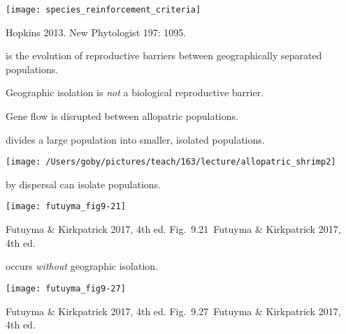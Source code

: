 \documentclass[t]{beamer}
\newcommand{\futuyma}[1]{%
	\ifthenelse{\isempty{#1}}%
	{Futuyma \& Kirkpatrick 2017, 4th ed.}%
	{Fig.~#1~Futuyma \& Kirkpatrick 2017, 4th ed.}%
}
\newcommand{\backskip}{\vspace{-0.5\baselineskip}}
\begin{document}
\begin{frame}
\centering

\texttt{[image: species\_reinforcement\_criteria]}

\tinyfill Hopkins 2013. New Phytologist 197: 1095.

\end{frame}


\begin{frame}{ is the evolution of reproductive barriers between geographically separated populations.}

\hangpara Geographic isolation is \emph{not} a biological reproductive barrier.

\hangpara Gene flow is disrupted between allopatric populations.

\end{frame}


\begin{frame}{ divides a large population into smaller, isolated populations.}

\vspace{-\baselineskip}

\centering

\texttt{[image: /Users/goby/pictures/teach/163/lecture/allopatric\_shrimp2]}

\end{frame}


\begin{frame}{ by dispersal can isolate populations.}

\backskip

\centering

\texttt{[image: futuyma\_fig9-21]}

\tinyfill \futuyma{9.21}
\end{frame}


\begin{frame}{ occurs \emph{without} geographic isolation.}

\backskip

\centering

\texttt{[image: futuyma\_fig9-27]}

\tinyfill \futuyma{9.27}

\end{frame}
\end{document}

